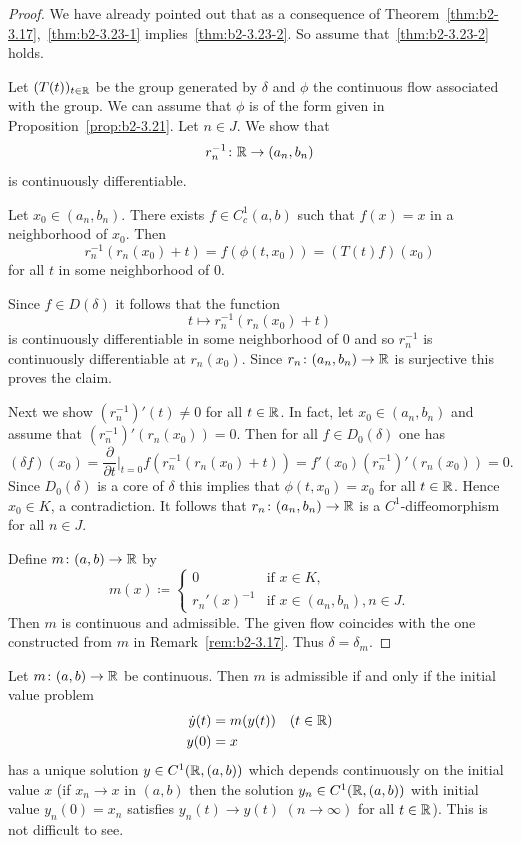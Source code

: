 \begin{proof}
We have already pointed out that as a consequence of Theorem~\ref{thm:b2-3.17},~\ref{thm:b2-3.23-1} implies~\ref{thm:b2-3.23-2}.
So assume that~\ref{thm:b2-3.23-2} holds.

Let $(T(t))_{t \in \mathbb{R}}$ be the group generated by $\delta$ and $\phi$ the continuous flow associated with the group.
We can assume that $\phi$ is of the form given in Proposition~\ref{prop:b2-3.21}.
Let $n \in J$.
We show that 
%
\[
	r_{n}^{-1} \colon \mathbb{R} \to (a_{n},b_{n})
\]
%
is continuously differentiable.

Let $x_{0} \in (a_{n},b_{n})$.
There exists $f \in C_{c}^{1}(a,b)$ such that $f(x) = x$ in a neighborhood of\/ $x_{0}$.
Then 
%
\[
	r_{n}^{-1}(r_{n}(x_{0}) + t) = f(\phi(t,x_{0})) = (T(t)f)(x_{0})
\]
%
for all $t$ in some neighborhood of\/ $0$.

Since $f \in D(\delta)$ it follows that the function 
%
\[
	t \mapsto r_{n}^{-1}(r_{n}(x_{0}) + t)
\]
%
is continuously differentiable in some neighborhood of\/ $0$ and so $r_{n}^{-1}$ is continuously differentiable at $r_{n}(x_{0})$.
Since $r_{n} \colon (a_{n},b_{n}) \to \mathbb{R}$ is surjective this proves the claim.

Next we show $(r_{n}^{-1})'(t) \neq 0$ for all $t \in \mathbb{R}$.
In fact, let $x_{0} \in (a_{n},b_{n})$ and assume that $(r_{n}^{-1})'(r_{n}(x_{0})) = 0$.
Then for all $f \in D_{0}(\delta)$ one has 
\[
(\delta f)(x_{0}) = \frac{\partial}{\partial t}\bigg|_{t=0} f(r_{n}^{-1}(r_{n}(x_{0}) + t)) = f'(x_{0})(r_{n}^{-1})'(r_{n}(x_{0})) = 0.
\]
Since $D_{0}(\delta)$ is a core of\/ $\delta$ this implies that $\phi(t,x_{0}) = x_{0}$ for all $t \in \mathbb{R}$.
Hence $x_{0} \in K$, a contradiction.
It follows that $r_{n} \colon (a_{n},b_{n}) \to \mathbb{R}$ is a $C^{1}$-diffeomorphism for all $n \in J$.

Define $m \colon (a,b) \to \mathbb{R}$ by
\begin{equation*}\label{eq:b2-m-def}
m(x) \coloneq \begin{cases}
    0 & \text{if } x \in K  ,\\
    r_{n}'(x)^{-1} & \text{if } x \in (a_{n},b_{n}), n \in J  .
\end{cases}
\end{equation*}
Then $m$ is continuous and admissible.
The given flow coincides with the one constructed from $m$ in Remark~\ref{rem:b2-3.17}.
Thus $\delta = \delta_{m}$.
\end{proof}
\begin{remark*}\label{rem:b2-3.24}
%
Let $m \colon (a,b) \to \mathbb{R}$ be continuous.
Then $m$ is admissible if and only if the initial value problem
\begin{align*}
\dot{y}(t) &= m(y(t)) \quad (t \in \mathbb{R}) \\
y(0) &= x
\end{align*}
has a unique solution $y \in C^{1}(\mathbb{R},(a,b))$ which depends continuously on the initial value $x$ (\ie  if\/ $x_{n} \to x$ in $(a,b)$ then the solution $y_{n} \in C^{1}(\mathbb{R},(a,b))$ with initial value $y_{n}(0) = x_{n}$ satisfies $y_{n}(t) \to y(t)$ $(n \to \infty)$ for all $t \in \mathbb{R}$).
This is not difficult to see.
\end{remark*}
